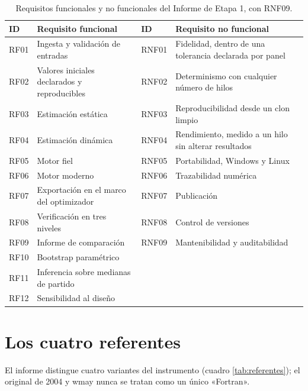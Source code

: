 \begin{table}[htbp]
\centering
\caption{Requisitos funcionales y no funcionales del Informe de Etapa 1, con RNF09.}
\label{tab:requisitos}
\footnotesize
\begin{tabular}{L{1.1cm}L{4.9cm}L{1.1cm}L{5.0cm}}
\toprule
ID & Requisito funcional & ID & Requisito no funcional \\
\midrule
RF01 & Ingesta y validación de entradas & RNF01 & Fidelidad, dentro de una tolerancia
declarada por panel \\
RF02 & Valores iniciales declarados y reproducibles & RNF02 & Determinismo con cualquier
número de hilos \\
RF03 & Estimación estática & RNF03 & Reproducibilidad desde un clon limpio \\
RF04 & Estimación dinámica & RNF04 & Rendimiento, medido a un hilo sin alterar resultados \\
RF05 & Motor fiel & RNF05 & Portabilidad, Windows y Linux \\
RF06 & Motor moderno & RNF06 & Trazabilidad numérica \\
RF07 & Exportación en el marco del optimizador & RNF07 & Publicación \\
RF08 & Verificación en tres niveles & RNF08 & Control de versiones \\
RF09 & Informe de comparación & RNF09 & Mantenibilidad y auditabilidad \\
RF10 & Bootstrap paramétrico & & \\
RF11 & Inferencia sobre medianas de partido & & \\
RF12 & Sensibilidad al diseño & & \\
\bottomrule
\end{tabular}
\end{table}

\section{Los cuatro referentes}
\label{sec:referentes}

El informe distingue cuatro variantes del instrumento (cuadro \ref{tab:referentes}); el
original de 2004 y wmay nunca se tratan como un único «Fortran».

